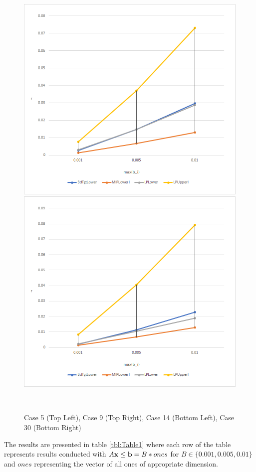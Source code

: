\begin{figure}[h]
\begin{center}
\includegraphics[scale=0.45]{Figures/Case14}
\includegraphics[scale=0.45]{Figures/Case30}
\caption{Case 5 (Top Left), Case 9 (Top Right), Case 14 (Bottom Left), Case 30 (Bottom Right)} \ \\
\end{center}
\label{fig:Graphs1}
\end{figure} 
The results are presented in table \ref{tbl:Table1} where each row of the table represents results conducted with $A\bold x\leq \bold b = B*ones$ for $B\in\{0.001, 0.005,0.01\}$ and $ones$ representing the vector of all ones of appropriate dimension. 
